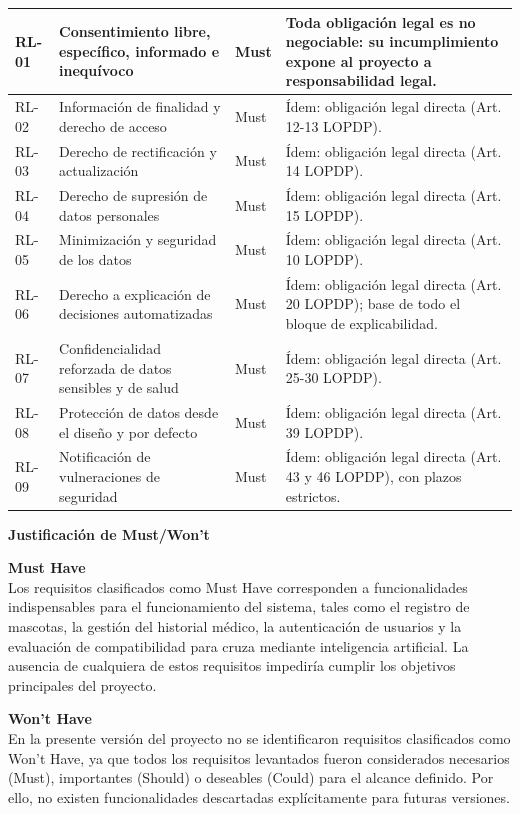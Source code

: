 \documentclass[journal,onecolumn]{IEEEtran}
\begin{document}
\begin{longtable}{@{}p{1.6cm} p{4.8cm} p{1.6cm} p{5.2cm}@{}}
		\hline
		RL-01 & Consentimiento libre, específico, informado e inequívoco & Must & Toda obligación legal es no negociable: su incumplimiento expone al proyecto a responsabilidad legal. \\
		\hline
		RL-02 & Información de finalidad y derecho de acceso & Must & Ídem: obligación legal directa (Art. 12-13 LOPDP). \\
		\hline
		RL-03 & Derecho de rectificación y actualización & Must & Ídem: obligación legal directa (Art. 14 LOPDP). \\
		\hline
		RL-04 & Derecho de supresión de datos personales & Must & Ídem: obligación legal directa (Art. 15 LOPDP). \\
		\hline
		RL-05 & Minimización y seguridad de los datos & Must & Ídem: obligación legal directa (Art. 10 LOPDP). \\
		\hline
		RL-06 & Derecho a explicación de decisiones automatizadas & Must & Ídem: obligación legal directa (Art. 20 LOPDP); base de todo el bloque de explicabilidad. \\
		\hline
		RL-07 & Confidencialidad reforzada de datos sensibles y de salud & Must & Ídem: obligación legal directa (Art. 25-30 LOPDP). \\
		\hline
		RL-08 & Protección de datos desde el diseño y por defecto & Must & Ídem: obligación legal directa (Art. 39 LOPDP). \\
		\hline
		RL-09 & Notificación de vulneraciones de seguridad & Must & Ídem: obligación legal directa (Art. 43 y 46 LOPDP), con plazos estrictos. \\
	\end{longtable}
	
	\textbf{Justificación de Must/Won't}
	
	\textbf{Must Have} \\
	Los requisitos clasificados como Must Have corresponden a funcionalidades
	indispensables para el funcionamiento del sistema, tales como el registro de
	mascotas, la gestión del historial médico, la autenticación de usuarios y la
	evaluación de compatibilidad para cruza mediante inteligencia artificial. La
	ausencia de cualquiera de estos requisitos impediría cumplir los objetivos
	principales del proyecto.
	
	\textbf{Won't Have} \\
	En la presente versión del proyecto no se identificaron requisitos
	clasificados como Won't Have, ya que todos los requisitos levantados fueron
	considerados necesarios (Must), importantes (Should) o deseables (Could) para
	el alcance definido. Por ello, no existen funcionalidades descartadas
	explícitamente para futuras versiones.
	
\end{document}

